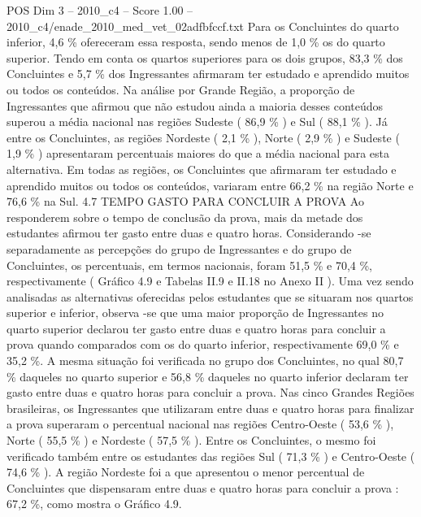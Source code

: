 \begin{textsample}{POS Dim 3 – 2010\_c4 – Score 1.00 – 2010\_c4/enade\_2010\_med\_vet\_02adfbfccf.txt}
Para os Concluintes do quarto inferior, 4,6 \% ofereceram essa resposta, sendo menos de 1,0 \% os do quarto superior.
Tendo em conta os quartos superiores para os dois grupos, 83,3 \% dos Concluintes e 5,7 \% dos Ingressantes afirmaram ter estudado e aprendido muitos ou todos os conteúdos.
Na análise por Grande Região, a proporção de Ingressantes que afirmou que não estudou ainda a maioria desses conteúdos superou a média nacional nas regiões Sudeste ( 86,9 \% ) e Sul ( 88,1 \% ).
Já entre os Concluintes, as regiões Nordeste ( 2,1 \% ), Norte ( 2,9 \% ) e Sudeste ( 1,9 \% ) apresentaram percentuais maiores do que a média nacional para esta alternativa.
Em todas as regiões, os Concluintes que afirmaram ter estudado e aprendido muitos ou todos os conteúdos, variaram entre 66,2 \% na região Norte e 76,6 \% na Sul. 4.7 TEMPO GASTO PARA CONCLUIR A PROVA Ao responderem sobre o tempo de conclusão da prova, mais da metade dos estudantes afirmou ter gasto entre duas e quatro horas.
Considerando -se separadamente as percepções do grupo de Ingressantes e do grupo de Concluintes, os percentuais, em termos nacionais, foram 51,5 \% e 70,4 \%, respectivamente ( Gráfico 4.9 e Tabelas II.9 e II.18 no Anexo II ).
Uma vez sendo analisadas as alternativas oferecidas pelos estudantes que se situaram nos quartos superior e inferior, observa -se que uma maior proporção de Ingressantes no quarto superior declarou ter gasto entre duas e quatro horas para concluir a prova quando comparados com os do quarto inferior, respectivamente 69,0 \% e 35,2 \%.
A mesma situação foi verificada no grupo dos Concluintes, no qual 80,7 \% daqueles no quarto superior e 56,8 \% daqueles no quarto inferior declaram ter gasto entre duas e quatro horas para concluir a prova.
Nas cinco Grandes Regiões brasileiras, os Ingressantes que utilizaram entre duas e quatro horas para finalizar a prova superaram o percentual nacional nas regiões Centro-Oeste ( 53,6 \% ), Norte ( 55,5 \% ) e Nordeste ( 57,5 \% ).
Entre os Concluintes, o mesmo foi verificado também entre os estudantes das regiões Sul ( 71,3 \% ) e Centro-Oeste ( 74,6 \% ).
A região Nordeste foi a que apresentou o menor percentual de Concluintes que dispensaram entre duas e quatro horas para concluir a prova : 67,2 \%, como mostra o Gráfico 4.9.

\end{textsample}
